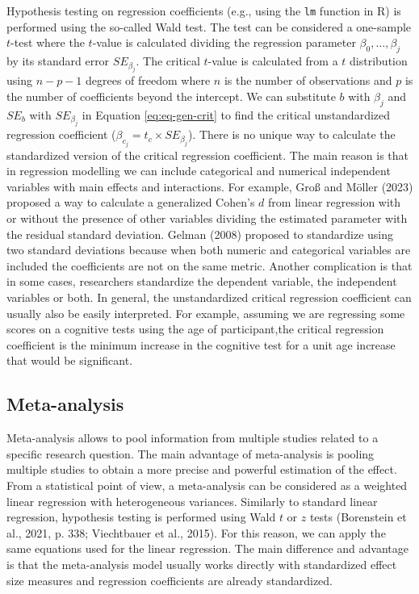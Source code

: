 \documentclass[
  man,floatsintext]{apa7}
\begin{document}
Hypothesis testing on regression coefficients (e.g., using the \texttt{lm} function in R) is performed using the so-called Wald test. The test can be considered a one-sample \(t\)-test where the \(t\)-value is calculated dividing the regression parameter \(\beta_0, \dots, \beta_j\) by its standard error \(SE_{\beta_j}\). The critical \(t\)-value is calculated from a \(t\) distribution using \(n - p - 1\) degrees of freedom where \(n\) is the number of observations and \(p\) is the number of coefficients beyond the intercept. We can substitute \(b\) with \(\beta_j\) and \(SE_{b}\) with \(SE_{\beta_j}\) in Equation \eqref{eq:eq-gen-crit} to find the critical unstandardized regression coefficient (\(\beta_{c_j} = t_c \times SE_{\beta_j}\)). There is no unique way to calculate the standardized version of the critical regression coefficient. The main reason is that in regression modelling we can include categorical and numerical independent variables with main effects and interactions. For example, Groß and Möller (2023) proposed a way to calculate a generalized Cohen's \(d\) from linear regression with or without the presence of other variables dividing the estimated parameter with the residual standard deviation. Gelman (2008) proposed to standardize using two standard deviations because when both numeric and categorical variables are included the coefficients are not on the same metric. Another complication is that in some cases, researchers standardize the dependent variable, the independent variables or both. In general, the unstandardized critical regression coefficient can usually also be easily interpreted. For example, assuming we are regressing some scores on a cognitive tests using the age of participant,the critical regression coefficient is the minimum increase in the cognitive test for a unit age increase that would be significant.

\subsection{Meta-analysis}\label{meta-analysis}

Meta-analysis allows to pool information from multiple studies related to a specific research question. The main advantage of meta-analysis is pooling multiple studies to obtain a more precise and powerful estimation of the effect. From a statistical point of view, a meta-analysis can be considered as a weighted linear regression with heterogeneous variances. Similarly to standard linear regression, hypothesis testing is performed using Wald \(t\) or \(z\) tests (Borenstein et al., 2021, p. 338; Viechtbauer et al., 2015). For this reason, we can apply the same equations used for the linear regression. The main difference and advantage is that the meta-analysis model usually works directly with standardized effect size measures and regression coefficients are already standardized.
\end{document}
